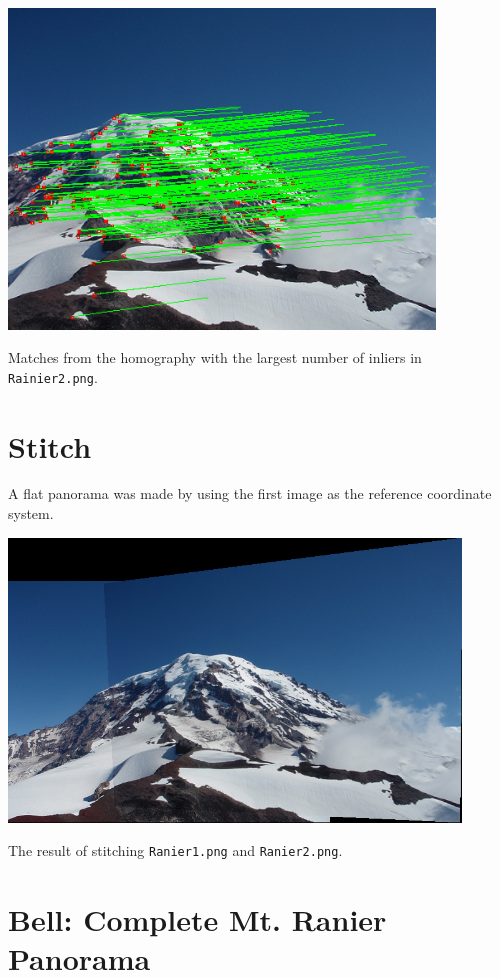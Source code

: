 \documentclass[letterpaper]{article}
\begin{document}
\begin{center}
  \includegraphics[width=0.85\textwidth]{3b.png}
  
  Matches from the homography with the largest number of inliers in
  \texttt{Rainier2.png}.
\end{center}

\section{Stitch}
\label{sec:stitch}

A flat panorama was made by using the first image as the reference coordinate
system.

\begin{center}
  \includegraphics[width=0.9\textwidth]{4.png}
  
  The result of stitching \texttt{Ranier1.png} and \texttt{Ranier2.png}.
\end{center}

\section*{Bell: Complete Mt. Ranier Panorama}
\end{document}
